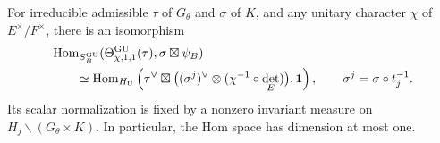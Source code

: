 \begin{theorem}\label{gu:thm:hom}
For irreducible admissible $\tau$ of $G_\theta$ and $\sigma$ of $K$, and any
unitary character $\chi$ of $E^\times/F^\times$, there is an isomorphism
\begin{equation}\label{gu:eq:hom-coverage}
 \begin{aligned}
 &\operatorname{Hom}_{S_B^{\operatorname{GU}}}(\Theta_{\chi,1,1}^{\operatorname{GU}}(\tau),
                         \sigma\boxtimes\psi_B)\\
 &\qquad\simeq
 \operatorname{Hom}_{H_{\mathrm U}}\left(\tau^\vee\boxtimes
  \bigl((\sigma^j)^\vee\otimes(\chi^{-1}\circ\det_E)\bigr),
  \mathbf1\right),\qquad \sigma^j=\sigma\circ t_j^{-1}.
 \end{aligned}
\end{equation}
Its scalar normalization is fixed by a nonzero invariant measure on
$H_j\backslash(G_\theta\times K)$. In particular, the Hom space has dimension
at most one.
\end{theorem}
